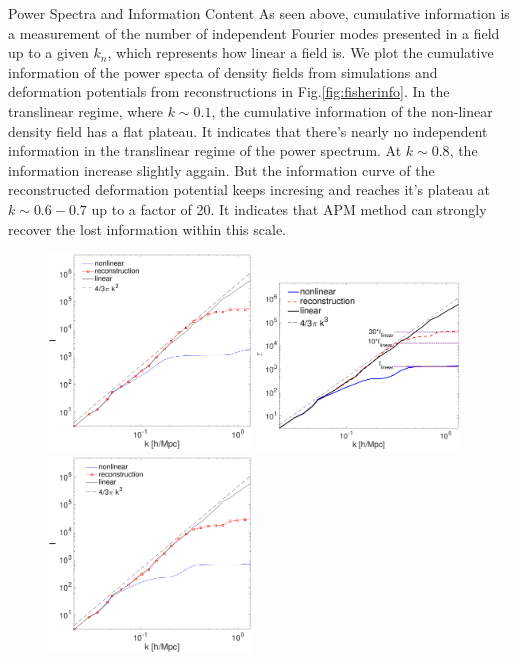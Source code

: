 \begin{section}{Power Spectra and Information Content}
  As seen above, cumulative information is a measurement of the number of independent Fourier modes 
presented in a field up to a given $k_n$, which represents how linear a field is. We plot the 
cumulative information of the power specta of density fields from simulations and deformation 
potentials from reconstructions in Fig.\ref{fig:fisherinfo}. In the translinear regime, where 
$k\sim0.1$, the cumulative information of the non-linear density field has a flat plateau. It 
indicates that there's nearly no independent information in the translinear regime of the power 
spectrum. At $k\sim0.8$, the information increase slightly aggain. But the information curve of 
the reconstructed deformation potential keeps incresing and reaches it's plateau at $k\sim0.6-0.7$ 
up to a factor of 20. It indicates that APM method can strongly recover the lost information within this scale. 
\begin{figure}[t!]
 \begin{center}
  \includegraphics[width=0.48\textwidth]{fisher_1-crop.pdf}
  \includegraphics[width=0.48\textwidth]{fisher_full-crop.pdf}
  \includegraphics[width=0.48\textwidth]{fisher_r2-crop.pdf}

\end{center}
\end{figure}
\end{section}
